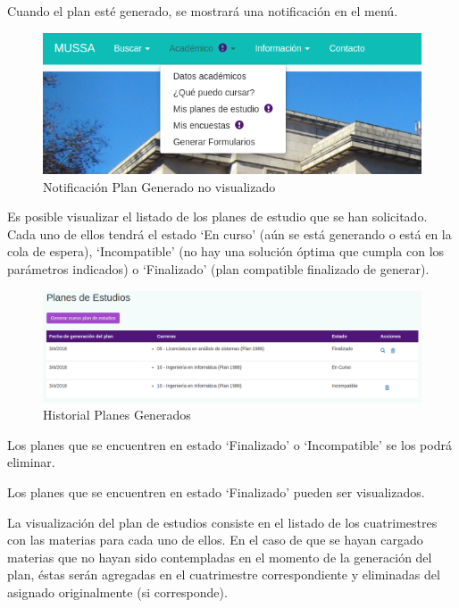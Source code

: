 \documentclass[a4paper]{article}
\begin{document}
Cuando el plan esté generado, se mostrará una notificación en el menú.

\begin{figure}[H]
\centering
\includegraphics[scale=0.35]{Imagenes/notificacion_plan_generado.png}\par
\caption{Notificación Plan Generado no visualizado}
\end{figure}

Es posible visualizar el listado de los planes de estudio que se han solicitado. Cada uno de ellos tendrá el estado `En curso' (aún se está generando o está en la cola de espera), `Incompatible' (no hay una solución óptima que cumpla con los parámetros indicados) o `Finalizado' (plan compatible finalizado de generar).

\begin{figure}[H]
\centering
\includegraphics[scale=0.3]{Imagenes/historial_planes_generados.png}\par
\caption{Historial Planes Generados}
\end{figure}

Los planes que se encuentren en estado `Finalizado' o `Incompatible' se los podrá eliminar.

Los planes que se encuentren en estado `Finalizado' pueden ser visualizados.

La visualización del plan de estudios consiste en el listado de los cuatrimestres con las materias para cada uno de ellos. En el caso de que se hayan cargado materias que no hayan sido contempladas en el momento de la generación del plan, éstas serán agregadas en el cuatrimestre correspondiente y eliminadas del asignado originalmente (si corresponde).
\end{document}
